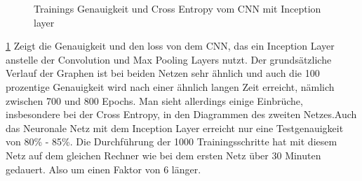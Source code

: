\documentclass[runningheads,a4paper]{llncs}[2015/06/24]
\begin{document}
\begin{figure}
	\caption{Trainings Genauigkeit und Cross Entropy vom CNN mit Inception layer}
	\label{fig:inception_result_graph}
\end{figure}
\cref{fig:inception_result_graph} Zeigt die Genauigkeit und den loss von dem CNN, das ein Inception Layer anstelle der Convolution und Max Pooling Layers nutzt. Der grundsätzliche Verlauf der Graphen ist bei beiden Netzen sehr ähnlich und auch die 100 prozentige Genauigkeit wird nach einer ähnlich langen Zeit erreicht, nämlich zwischen 700 und 800 Epochs. Man sieht allerdings einige Einbrüche, insbesondere bei der Cross Entropy, in den Diagrammen des zweiten Netzes.Auch das Neuronale Netz mit dem Inception Layer erreicht nur eine Testgenauigkeit von 80\% - 85\%. Die Durchführung der 1000 Trainingsschritte hat mit diesem Netz auf dem gleichen Rechner wie bei dem ersten Netz über 30 Minuten gedauert. Also um einen Faktor von 6 länger.
\end{document}
